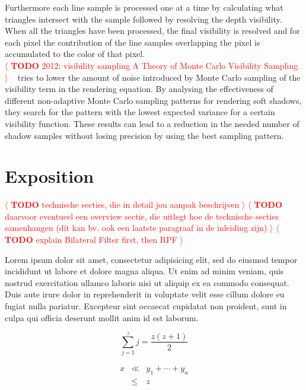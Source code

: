 \documentclass[review]{acmsiggraph}
\newcommand{\todo}[1]{\textcolor{red}{\(\langle\) \textbf{TODO} #1 \(\rangle\) }}
\begin{document}
Furthermore each line sample is processed one at a time by calculating what triangles intersect with the sample followed by resolving the depth visibility.
When all the triangles have been processed, the final visibility is resolved and for each pixel the contribution of the line samples overlapping the pixel is accumulated to the color of that pixel.
\\
\todo{2012: visibility sampling  A Theory of Monte Carlo Visibility Sampling}
~\cite{Ramamoorthi:2012:ATO} tries to lower the amount of noise introduced by Monte Carlo sampling of the visibility term in the rendering equation.
By analysing the effectiveness of different non-adaptive Monte Carlo sampling patterns for rendering soft shadows, 
they search for the pattern with the lowest expected variance for a certain visibility function.
These results can lead to a reduction in the needed number of shadow samples without losing precision by using the best sampling pattern.
\\

\section{Exposition}
\todo{technische secties, die in detail jou aanpak beschrijven}
\todo{daarvoor eventueel een overview sectie, die uitlegt hoe de technische secties samenhangen (dit kan bv. ook een laatste paragraaf in de inleiding zijn)}
\todo{explain Bilateral Filter first, then RPF}

Lorem ipsum dolor sit amet, consectetur adipisicing elit, sed do
eiusmod tempor incididunt ut labore et dolore magna aliqua. Ut enim ad
minim veniam, quis nostrud exercitation ullamco laboris nisi ut
aliquip ex ea commodo consequat. Duis aute irure dolor in
reprehenderit in voluptate velit esse cillum dolore eu fugiat nulla
pariatur. Excepteur sint occaecat cupidatat non proident, sunt in
culpa qui officia deserunt mollit anim id est laborum.

\begin{equation}
 \sum_{j=1}^{z} j = \frac{z(z+1)}{2}
\end{equation}

\begin{eqnarray}
x & \ll & y_{1} + \cdots + y_{n} \\
  & \leq & z
\end{eqnarray}
\end{document}

